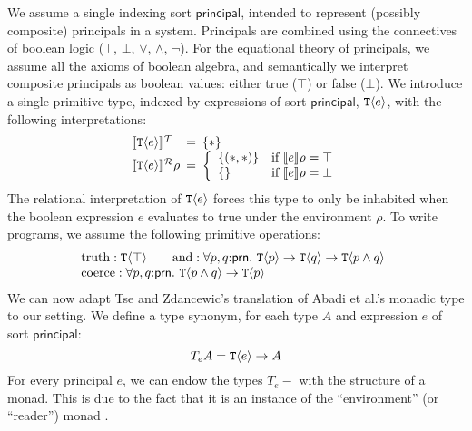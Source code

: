 We assume a single indexing sort $\mathsf{principal}$, intended to
represent (possibly composite) principals in a system. Principals are
combined using the connectives of boolean logic ($\top$, $\bot$,
$\lor$, $\land$, $\lnot$). For the equational theory of principals, we
assume all the axioms of boolean algebra, and semantically we
interpret composite principals as boolean values: either true ($\top$)
or false ($\bot$). We introduce a single primitive type, indexed by
expressions of sort $\mathsf{principal}$, $\textup{\texttt{T}}\langle e \rangle$, with the
following interpretations:
\begin{displaymath}
  \begin{array}{l@{\hspace{0.5em}=\hspace{0.5em}}l}
    \tySem{\tyPrim{T}{e}} & \{*\} \\
    \rsem{\tyPrim{T}{e}}{}\rho & \left\{
      \begin{array}{ll}
        \{(*,*)\} & \textrm{if }\sem{e}\rho = \top \\
        \{\}      & \textrm{if }\sem{e}\rho = \bot
      \end{array}
      \right.
  \end{array}
\end{displaymath}
The relational interpretation of $\textup{\texttt{T}}\langle e \rangle$ forces this type to
only be inhabited when the boolean expression $e$ evaluates to true
under the environment $\rho$. To write programs, we assume the
following primitive operations:
\begin{displaymath}
  \begin{array}{l}
  \begin{array}{@{}c@{\hspace{2em}}c}
    \mathrm{truth} : \tyPrim{T}{\top} &
    \mathrm{and}   : \forall p, q\mathord:\mathsf{prn}.\ \tyPrim{T}{p} \to \tyPrim{T}{q} \to \tyPrim{T}{p \land q}
  \end{array} \\
  \mathrm{coerce} : \forall p, q\mathord:\mathsf{prn}.\ \tyPrim{T}{p \land q} \to \tyPrim{T}{p}
\end{array}
\end{displaymath}
We can now adapt Tse and Zdancewic's translation of Abadi et al.'s
monadic type to our setting. We define a type synonym, for each type
$A$ and expression $e$ of sort $\mathsf{principal}$:
\begin{displaymath}
  T_eA = \textup{\texttt{T}}\langle e \rangle \to A
\end{displaymath}
For every principal $e$, we can endow the types $T_e-$ with the
structure of a monad. This is due to the fact that it is an instance
of the ``environment'' (or ``reader'') monad \cite{jones95functional}.

